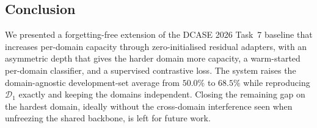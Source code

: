 \documentclass{article}
\begin{document}
\begin{sloppy}
\section{Conclusion}
\label{sec:conclusion}

We presented a forgetting-free extension of the DCASE 2026 Task~7 baseline
that increases per-domain capacity through zero-initialised residual
adapters, with an asymmetric depth that gives the harder domain more
capacity, a warm-started per-domain classifier, and a supervised contrastive
loss. The system raises the domain-agnostic development-set average from
$50.0\%$ to $68.5\%$ while reproducing $\mathcal{D}_1$ exactly and keeping
the domains independent. Closing the remaining gap on the hardest domain,
ideally without the cross-domain interference seen when unfreezing the shared
backbone, is left for future work.





\end{sloppy}
\end{document}
